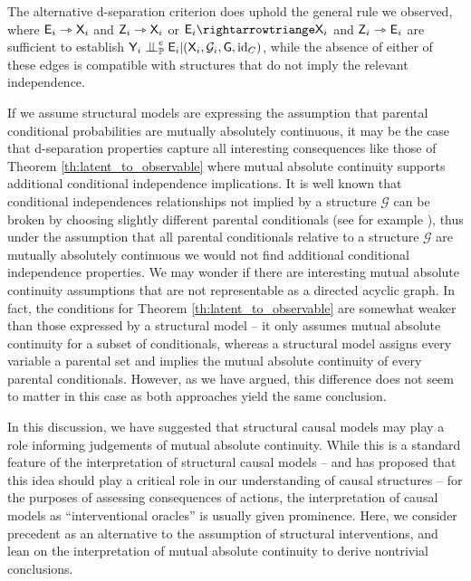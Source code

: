 The alternative d-separation criterion does uphold the general rule we observed, where $\mathsf{E}_i\rightarrowtriangle \mathsf{X}_i$ and $\mathsf{Z}_i\rightarrowtriangle \mathsf{X}_i$ or $\RV{E}_i\rightarrowtriange \RV{X}_i$ and $\mathsf{Z}_i\rightarrowtriangle \mathsf{E}_i$ are sufficient to establish $\RV{Y}_i \CI^e_{\prob{P}} \RV{E}_i | (\RV{X}_i, \mathcal{G}_i, \RV{G}, \mathrm{id}_C)$, while the absence of either of these edges is compatible with structures that do not imply the relevant independence.

If we assume structural models are expressing the assumption that parental conditional probabilities are mutually absolutely continuous, it may be the case that d-separation properties capture all interesting consequences like those of Theorem \ref{th:latent_to_observable} where mutual absolute continuity supports additional conditional independence implications. It is well known that conditional independences relationships not implied by a structure $\mathcal{G}$ can be broken by choosing slightly different parental conditionals (see for example \citet{meek_strong_1995,zhang_strong_2003}), thus under the assumption that all parental conditionals relative to a structure $\mathcal{G}$ are mutually absolutely continuous we would not find additional conditional independence properties. We may wonder if there are interesting mutual absolute continuity assumptions that are not representable as a directed acyclic graph. In fact, the conditions for Theorem \ref{th:latent_to_observable} are somewhat weaker than those expressed by a structural model -- it only assumes mutual absolute continuity for a subset of conditionals, whereas a structural model assigns every variable a parental set and implies the mutual absolute continuity of every parental conditionals. However, as we have argued, this difference does not seem to matter in this case as both approaches yield the same conclusion.

In this discussion, we have suggested that structural causal models may play a role informing judgements of mutual absolute continuity. While this is a standard feature of the interpretation of structural causal models -- and \citet{lemeire_replacing_2013} has proposed that this idea should play a critical role in our understanding of causal structures -- for the purposes of assessing consequences of actions, the interpretation of causal models as ``interventional oracles'' \citep[Section 1.3.1]{pearl_causality:_2009} is usually given prominence. Here, we consider precedent as an alternative to the assumption of structural interventions, and lean on the interpretation of mutual absolute continuity to derive nontrivial conclusions.

